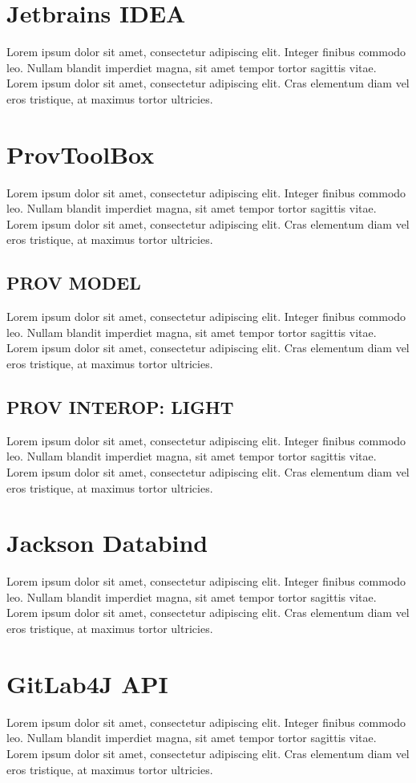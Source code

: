 \documentclass[
  digital,     %
  oneside,     %
  nosansbold,  %
  nocolorbold, %
  lof,         %
  lot,         %
]{fithesis4}
\begin{document}
\section{Jetbrains IDEA}
Lorem ipsum dolor sit amet, consectetur adipiscing elit. Integer finibus commodo leo. Nullam blandit imperdiet magna, sit amet tempor tortor sagittis vitae. Lorem ipsum dolor sit amet, consectetur adipiscing elit. Cras elementum diam vel eros tristique, at maximus tortor ultricies.
\section{ProvToolBox}
Lorem ipsum dolor sit amet, consectetur adipiscing elit. Integer finibus commodo leo. Nullam blandit imperdiet magna, sit amet tempor tortor sagittis vitae. Lorem ipsum dolor sit amet, consectetur adipiscing elit. Cras elementum diam vel eros tristique, at maximus tortor ultricies.
\subsection{PROV MODEL}
Lorem ipsum dolor sit amet, consectetur adipiscing elit. Integer finibus commodo leo. Nullam blandit imperdiet magna, sit amet tempor tortor sagittis vitae. Lorem ipsum dolor sit amet, consectetur adipiscing elit. Cras elementum diam vel eros tristique, at maximus tortor ultricies.
\subsection{PROV INTEROP: LIGHT}
Lorem ipsum dolor sit amet, consectetur adipiscing elit. Integer finibus commodo leo. Nullam blandit imperdiet magna, sit amet tempor tortor sagittis vitae. Lorem ipsum dolor sit amet, consectetur adipiscing elit. Cras elementum diam vel eros tristique, at maximus tortor ultricies.
\section{Jackson Databind}
Lorem ipsum dolor sit amet, consectetur adipiscing elit. Integer finibus commodo leo. Nullam blandit imperdiet magna, sit amet tempor tortor sagittis vitae. Lorem ipsum dolor sit amet, consectetur adipiscing elit. Cras elementum diam vel eros tristique, at maximus tortor ultricies.
\section{GitLab4J API}
Lorem ipsum dolor sit amet, consectetur adipiscing elit. Integer finibus commodo leo. Nullam blandit imperdiet magna, sit amet tempor tortor sagittis vitae. Lorem ipsum dolor sit amet, consectetur adipiscing elit. Cras elementum diam vel eros tristique, at maximus tortor ultricies.
\end{document}
